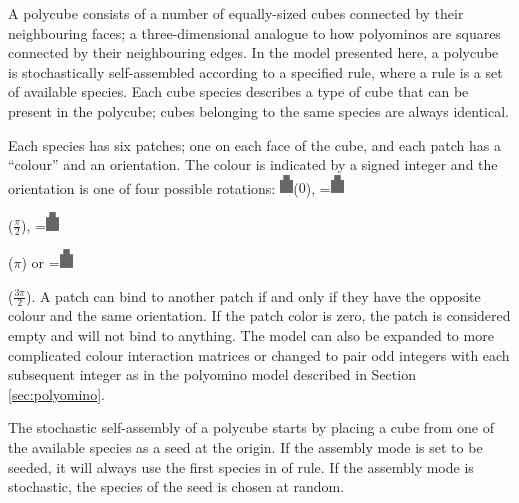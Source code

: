 A polycube consists of a number of equally-sized cubes connected by their neighbouring faces; a three-dimensional analogue to how polyominos are squares connected by their neighbouring edges. In the model presented here, a polycube is stochastically self-assembled according to a specified rule, where a rule is a set of available species. Each cube species describes a type of cube that can be present in the polycube; cubes belonging to the same species are always identical.

Each species has six patches; one on each face of the cube, and each patch has a ``colour'' and an orientation. The colour is indicated by a signed integer and the orientation is one of four possible rotations: \includegraphics[width=10pt]{figures/face.eps}\hspace{4pt}(\(0\)),
\begingroup{}=\hbox{\includegraphics[width=10pt,angle=-90]{figures/face.eps}}\parbox{\wd0}{}\endgroup\hspace{4pt}(\(\frac{\pi}{2}\)),
\begingroup{}=\hbox{\includegraphics[width=10pt,angle=180]{figures/face.eps}}\parbox{\wd0}{}\endgroup\hspace{4pt}(\(\pi\)) or
\begingroup{}=\hbox{\includegraphics[width=10pt,angle=90]{figures/face.eps}}\parbox{\wd0}{}\endgroup\hspace{4pt}(\(\frac{3\pi}{2}\)). A patch can bind to another patch if and only if they have the opposite colour and the same orientation. If the patch color is zero, the patch is considered empty and will not bind to anything. The model can also be expanded to more complicated colour interaction matrices or changed to pair odd integers with each subsequent integer as in the polyomino model\cite{ahnert2010self}\cite{johnston2011evolutionary} described in Section \ref{sec:polyomino}.

The stochastic self-assembly of a polycube starts by placing a cube from one of the available species as a seed at the origin. If the assembly mode is set to be seeded, it will always use the first species in of rule. If the assembly mode is stochastic, the species of the seed is chosen at random.

